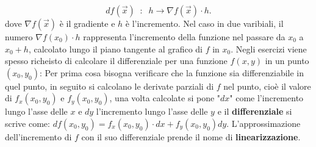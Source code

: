 \[
    df(\vec{x}) \;\;:\;\;h \rightarrow  \nabla f(\vec{x}) \cdot h.
\] 
dove $\nabla f(\vec{x})$ è il gradiente e $h$ è l'incremento.\newline
Nel caso in due varibiali, il numero $\nabla f(x_0) \cdot h$ rappresenta l'incremento della funzione nel passare da $x_0$ a $x_0+h$, calcolato lungo il piano tangente al grafico di $f$ in $x_0$.\newline
\newline
Negli esercizi viene spesso richeisto di calcolare il differenziale per una funzione $f(x,y)$ in un punto $(x_0,y_0)$: Per prima cosa bisogna verificare che la funzione sia differenziabile in quel punto, in seguito si calcolano le derivate parziali di $f$ nel punto, cioè il valore di $f_x(x_0,y_0)$ e $f_y(x_0,y_0)$, una volta calcolate si pone "$dx$" come l'incremento lungo l'asse delle $x$ e $dy$ l'incremento lungo l'asse delle $y$ e il \textbf{differenziale} si scrive come: $df(x_0,y_0) = f_x(x_0,y_0) \cdot dx + f_y(x_0,y_0) dy$.\newline
\newline
L'approssimazione dell'incremento di $f$ con il suo differenziale prende il nome di \textbf{linearizzazione}.
